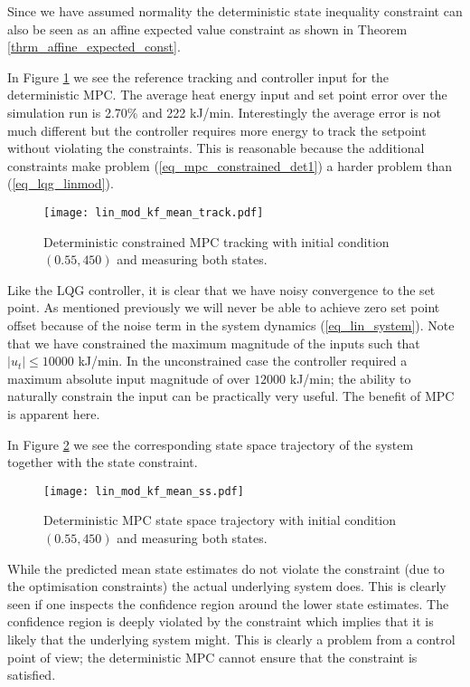 Since we have assumed normality the deterministic state inequality constraint can also be seen as an affine expected value constraint as shown in Theorem \ref{thrm_affine_expected_const}.

In Figure \ref{fig_lin_mod_kf_mean_track} we see the reference tracking and controller input for the deterministic MPC. The average heat energy input and set point error over the simulation run is 2.70\% and 222 kJ/min. Interestingly the average error is not much different but the controller requires more energy to track the setpoint without violating the constraints. This is reasonable because the additional constraints make problem (\ref{eq_mpc_constrained_det1}) a harder problem than (\ref{eq_lqg_linmod}).
\begin{figure}[H] 
\centering
\texttt{[image: lin\_mod\_kf\_mean\_track.pdf]}
\caption{Deterministic constrained MPC tracking with initial condition $(0.55, 450)$ and measuring both states.}
\label{fig_lin_mod_kf_mean_track}
\end{figure}
Like the LQG controller, it is clear that we have noisy convergence to the set point. As mentioned previously we will never be able to achieve zero set point offset because of the noise term in the system dynamics (\ref{eq_lin_system}). Note that we have constrained the maximum magnitude of the inputs such that $|u_t| \leq 10000$ kJ/min. In the unconstrained case the controller required a maximum absolute input magnitude of over $12000$ kJ/min; the ability to naturally constrain the input can be practically very useful. The benefit of MPC is apparent here.

In Figure \ref{fig_lin_mod_kf_mean_ss} we see the corresponding state space trajectory of the system together with the state constraint.
\begin{figure}[H] 
\centering
\texttt{[image: lin\_mod\_kf\_mean\_ss.pdf]}
\caption{Deterministic MPC state space trajectory with initial condition $(0.55, 450)$ and measuring both states.}
\label{fig_lin_mod_kf_mean_ss}
\end{figure}
While the predicted mean state estimates do not violate the constraint (due to the optimisation constraints) the actual underlying system does.  This is clearly seen if one inspects the confidence region around the lower state estimates. The confidence region is deeply violated by the constraint which implies that it is likely that the underlying system might. This is clearly a problem from a control point of view; the deterministic MPC cannot ensure that the constraint is satisfied.

